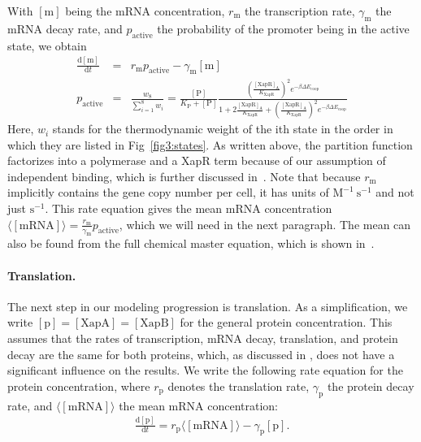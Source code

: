 \documentclass[10pt,letterpaper]{article}
\newcommand{\n}[1]{\mathrm{#1}}
\newcommand{\dd}[2]{\frac{\mathrm{d} #1}{\mathrm{d} #2}}
\begin{document}
	With $\n{[m]}$ being the mRNA concentration, $r_{\n{m}}$ the transcription
	rate, $\gamma_{\n{m}}$ the mRNA decay rate, and $p_{\n{active}}$ the
	probability of the promoter being in the active state, we obtain
	\begin{eqnarray}
	\label{eq:mbasic}
	\dd{\n{[m]}}{t} &=& r_{\n{m}} p_{\n{active}} - \gamma_{\n{m}} \n{[m]} \\
	p_{\n{active}} &=& \frac{w_8}{\sum_{i=1}^{8} w_i} = 
	\frac{\n{[P]}}{K_{\n{P}}+\n{[P]}} 
	\frac{
		\left( \frac{\mathrm{[XapR]_A}}{K_{\mathrm{XapR}}} \right)^2 
		e^{- \beta \Delta E_{\n{coop}}}
	}{
		1 + 
		2 \frac{\mathrm{[XapR]_A}}{K_{\mathrm{XapR}}} +
		\left( \frac{\mathrm{[XapR]_A}}{K_{\mathrm{XapR}}} \right)^2 e^{- \beta \Delta E_{\n{coop}}}
	}
	\end{eqnarray}
	Here, $w_i$ stands for the thermodynamic weight of the ith state in the
	order in which they are listed in Fig~\ref{fig3:states}. As written above,
	the partition function factorizes into a polymerase and a XapR term because
	of our assumption of independent binding, which is further discussed
	in~. Note that because $r_{\n{m}}$ implicitly contains the
	gene copy number per cell, it has units of $\n{M^{-1} \ s^{-1}}$ and not
	just $\n{s^{-1}}$. This rate equation gives the mean mRNA concentration
	$\langle\n{[mRNA]}\rangle = \frac{r_{\n{m}}}{\gamma_{\n{m}}}
	p_{\n{active}}$, which we will need in the next paragraph. The mean can also be found from the full chemical master equation, which is shown in~.
	
	\paragraph*{Translation.} 
	The next step in our modeling progression is translation. As a
	simplification, we write $\n{[p]}=\n{[XapA]=[XapB]}$ for the general protein
	concentration. This assumes that the rates of transcription, mRNA decay,
	translation, and protein decay are the same for both proteins, which, as
	discussed in , does not have a significant influence on the
	results. We write the following rate equation for the protein concentration,
	where $r_{\n{p}}$ denotes the translation rate, $\gamma_{\n{p}}$ the protein
	decay rate, and $\langle \n{[mRNA]} \rangle$ the mean mRNA concentration:
	\begin{eqnarray}
	\label{eq:pbasic}
	\dd{\n{[p]}}{t} = r_{\n{p}} \langle \n{[mRNA]} \rangle - \gamma_{\n{p}} \n{[p]}.
	\end{eqnarray}
	
\end{document}
